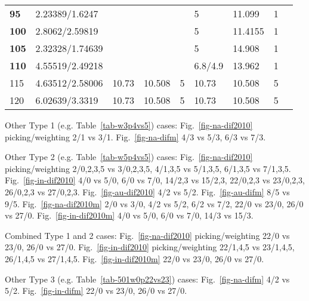 \begin{table*}
\begin{tabular}{|l|l|l|l|l|l|l|l|l|l}
\textbf{95} & 2.23389/1.6247 & \multicolumn{3}{l|}{} & 5 & 11.099 & 1 & \multicolumn{2}{l|}{} \\ \cline{1-2} \cline{6-8}
\textbf{100} & 2.8062/2.59819 & \multicolumn{3}{l|}{} & 5 & 11.4155 & 1 & \multicolumn{2}{l|}{} \\ \cline{1-2} \cline{6-8}
\textbf{105} & 2.32328/1.74639 & \multicolumn{3}{l|}{} & 5 & 14.908 & 1 & \multicolumn{2}{l|}{} \\ \cline{1-2} \cline{6-8}
\textbf{110} & 4.55519/2.49218 & \multicolumn{3}{l|}{} & 6.8/4.9 & 13.962 & 1 & \multicolumn{2}{l|}{} \\ \cline{1-8}
115 & 4.63512/2.58006 & 10.73 & 10.508 & 5 & 10.73 & 10.508 & 5 & \multicolumn{2}{l|}{} \\ \cline{1-8}
120 & 6.02639/3.3319 & 10.73 & 10.508 & 5 & 10.73 & 10.508 & 5 & \multicolumn{2}{l|}{} \\ \cline{1-8}
\end{tabular}
\end{table*}

Other Type 1 (e.g. Table~\ref{tab-w3p4vs5}) cases: Fig.~\ref{fig-na-dif2010}
picking/weighting 2/1 vs 3/1. Fig.~\ref{fig-na-difm} 4/3 vs 5/3, 6/3 vs 7/3.

Other Type 2 (e.g. Table~\ref{tab-w5p4vs5}) cases: Fig.~\ref{fig-na-dif2010}
picking/weighting 2/0,2,3,5 vs 3/0,2,3,5, 4/1,3,5 vs 5/1,3,5, 6/1,3,5 vs
7/1,3,5. Fig.~\ref{fig-in-dif2010} 4/0 vs 5/0,
6/0 vs 7/0, 14/2,3 vs 15/2,3, 22/0,2,3 vs 23/0,2,3,
26/0,2,3 vs 27/0,2,3. Fig.~\ref{fig-au-dif2010} 4/2 vs 5/2.
Fig.~\ref{fig-au-difm} 8/5 vs 9/5. Fig.~\ref{fig-na-dif2010m} 2/0
vs 3/0, 4/2 vs 5/2, 6/2 vs 7/2, 22/0 vs
23/0, 26/0 vs 27/0.
Fig.~\ref{fig-in-dif2010m} 4/0 vs 5/0, 6/0
vs 7/0, 14/3 vs 15/3.

Combined Type 1 and 2 cases: Fig.~\ref{fig-na-dif2010} picking/weighting
22/0 vs 23/0, 26/0 vs 27/0.
Fig.~\ref{fig-in-dif2010} picking/weighting 22/1,4,5 vs 23/1,4,5, 26/1,4,5 vs
27/1,4,5. Fig.~\ref{fig-in-dif2010m} 22/0 vs 23/0,
26/0 vs 27/0.

Other Type 3 (e.g. Table~\ref{tab-501w0p22vs23}) cases: Fig.~\ref{fig-na-difm}
4/2 vs 5/2. Fig.~\ref{fig-in-difm} 22/0 vs
23/0, 26/0 vs 27/0.


